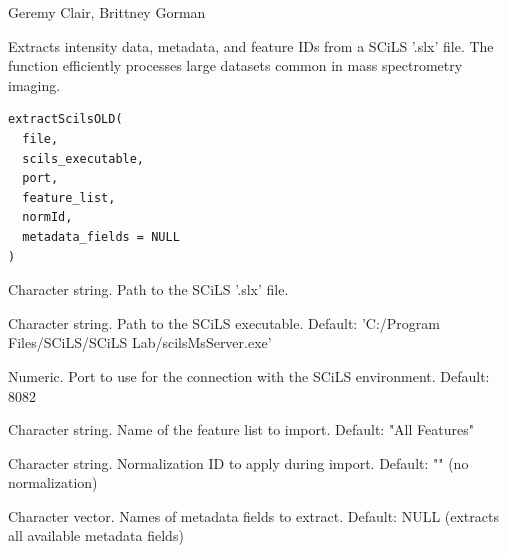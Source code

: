 \documentclass[a4paper]{book}
\begin{document}
%
\begin{Author}
Geremy Clair, Brittney Gorman
\end{Author}
%
\begin{Examples}
\end{Examples}
%
\begin{Description}
Extracts intensity data, metadata, and feature IDs from a SCiLS '.slx' file.
The function efficiently processes large datasets common in mass spectrometry imaging.
\end{Description}
%
\begin{Usage}
\begin{verbatim}
extractScilsOLD(
  file,
  scils_executable,
  port,
  feature_list,
  normId,
  metadata_fields = NULL
)
\end{verbatim}
\end{Usage}
%
\begin{Arguments}
\begin{ldescription}
\item[\code{file}] Character string. Path to the SCiLS '.slx' file.

\item[\code{scils\_executable}] Character string. Path to the SCiLS executable.
Default: 'C:/Program Files/SCiLS/SCiLS Lab/scilsMsServer.exe'

\item[\code{port}] Numeric. Port to use for the connection with the SCiLS environment.
Default: 8082

\item[\code{feature\_list}] Character string. Name of the feature list to import.
Default: "All Features"

\item[\code{normId}] Character string. Normalization ID to apply during import.
Default: "" (no normalization)

\item[\code{metadata\_fields}] Character vector. Names of metadata fields to extract.
Default: NULL (extracts all available metadata fields)
\end{ldescription}
\end{Arguments}
\end{document}

